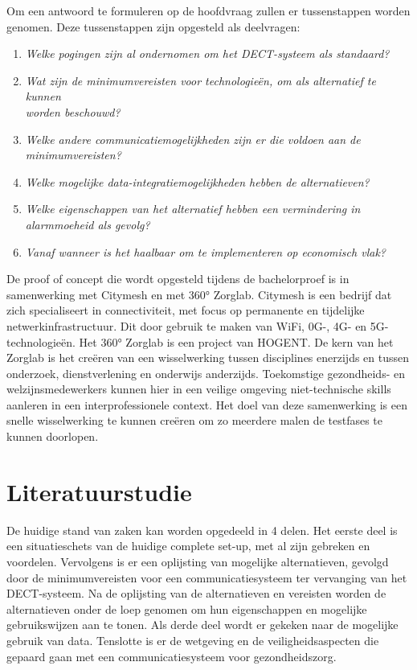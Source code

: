 Om een antwoord te formuleren op de hoofdvraag zullen er tussenstappen worden genomen. Deze tussenstappen zijn opgesteld als deelvragen:

\begin{enumerate}
  \item \textit{Welke pogingen zijn al ondernomen om het DECT-systeem als standaard?}
  \item \textit{Wat zijn de minimumvereisten voor technologieën, om als alternatief te kunnen \\worden beschouwd?}
  \item \textit{Welke andere communicatiemogelijkheden zijn er die voldoen aan de minimumvereisten?}
  \item \textit{Welke mogelijke data-integratiemogelijkheden hebben de alternatieven?}
  \item \textit{Welke eigenschappen van het alternatief hebben een vermindering in alarmmoeheid als gevolg?}
  \item \textit{Vanaf wanneer is het haalbaar om te implementeren op economisch vlak?}
\end{enumerate}

De proof of concept die wordt opgesteld tijdens de bachelorproef is in samenwerking met Citymesh en met 360° Zorglab. Citymesh is een bedrijf dat zich specialiseert in connectiviteit, met focus op permanente en tijdelijke netwerkinfrastructuur. Dit door gebruik te maken van WiFi, 0G-, 4G- en 5G-technologieën. \autocite{Citymesh2024} Het 360° Zorglab is een project van HOGENT. De kern van het Zorglab is het creëren van een wisselwerking tussen disciplines enerzijds en tussen onderzoek, dienstverlening en onderwijs anderzijds. Toekomstige gezondheids- en welzijnsmedewerkers kunnen hier in een veilige omgeving niet-technische skills aanleren in een interprofessionele context. \autocite{HOGENT2024} Het doel van deze samenwerking is een snelle wisselwerking te kunnen creëren om zo meerdere malen de testfases te kunnen doorlopen. 

\section{Literatuurstudie}%
\label{sec:literatuurstudie}

De huidige stand van zaken kan worden opgedeeld in 4 delen. Het eerste deel is een situatieschets van de huidige complete set-up, met al zijn gebreken en voordelen. Vervolgens is er een oplijsting van mogelijke alternatieven, gevolgd door de minimumvereisten voor een communicatiesysteem ter vervanging van het DECT-systeem. Na de oplijsting van de alternatieven en vereisten worden de alternatieven onder de loep genomen om hun eigenschappen en mogelijke gebruikswijzen aan te tonen. Als derde deel wordt er gekeken naar de mogelijke gebruik van data. Tenslotte is er de wetgeving en de veiligheidsaspecten die gepaard gaan met een communicatiesysteem voor gezondheidszorg.

